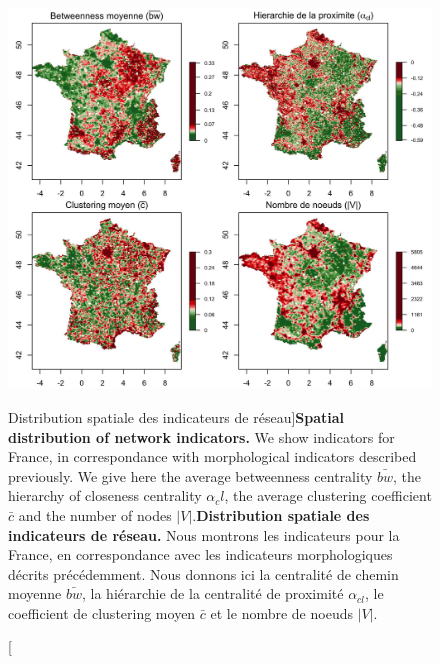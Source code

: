



\begin{figure}
\includegraphics[width=\linewidth]{Figures/Final/4-1-2-fig-staticcorrs-network}
\caption[Spatial distribution of network indicators][Distribution spatiale des indicateurs de réseau]{\textbf{Spatial distribution of network indicators.} We show indicators for France, in correspondance with morphological indicators described previously. We give here the average betweenness centrality $\bar{bw}$, the hierarchy of closeness centrality $\alpha_cl$, the average clustering coefficient $\bar{c}$ and the number of nodes $\left|V\right|$.\label{fig:staticcorrs:network}}{\textbf{Distribution spatiale des indicateurs de réseau.} Nous montrons les indicateurs pour la France, en correspondance avec les indicateurs morphologiques décrits précédemment. Nous donnons ici la centralité de chemin moyenne $\bar{bw}$, la hiérarchie de la centralité de proximité $\alpha_{cl}$, le coefficient de clustering moyen $\bar{c}$ et le nombre de noeuds $\left|V\right|$.\label{fig:staticcorrs:network}}
\end{figure}




